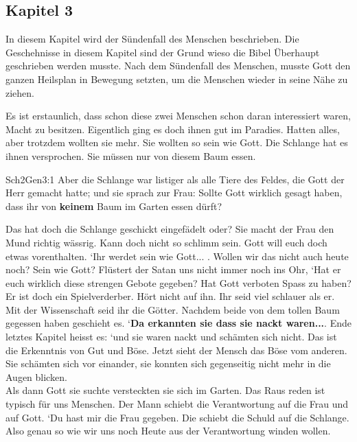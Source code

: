 \subsection{Kapitel 3}
In diesem Kapitel wird der Sündenfall des Menschen beschrieben. Die Geschehnisse in diesem Kapitel sind der Grund wieso die Bibel Überhaupt geschrieben werden musste. Nach dem Sündenfall des Menschen, musste Gott den ganzen Heilsplan in Bewegung setzten, um die Menschen wieder in seine Nähe zu ziehen.

Es ist erstaunlich, dass schon diese zwei Menschen schon daran interessiert waren, Macht zu besitzen. Eigentlich ging es doch ihnen gut im Paradies. Hatten alles, aber trotzdem wollten sie mehr. Sie wollten so sein wie Gott. Die Schlange hat es ihnen versprochen. Sie müssen nur von diesem Baum essen.
\begin{bibeltext}{Sch2}{Gen}{3:1}
	Aber die Schlange war listiger als alle Tiere des Feldes, die Gott der Herr gemacht hatte; und sie sprach zur Frau: Sollte Gott wirklich gesagt haben, dass ihr von \textbf{keinem} Baum im Garten essen dürft?
\end{bibeltext}
Das hat doch die Schlange geschickt eingefädelt oder? Sie macht der Frau den Mund richtig wässrig. Kann doch nicht so schlimm sein. Gott will euch doch etwas vorenthalten. \textquoteleft{Ihr werdet sein wie Gott... }. Wollen wir das nicht auch heute noch? Sein wie Gott? Flüstert der Satan uns nicht immer noch ins Ohr, \textquoteleft{Hat er euch wirklich diese strengen Gebote gegeben? Hat Gott verboten Spass zu haben? Er ist doch ein Spielverderber. Hört nicht auf ihn. Ihr seid viel schlauer als er. Mit der Wissenschaft seid ihr die Götter}.
Nachdem beide von dem tollen Baum gegessen haben geschieht es. \textquoteleft{\textbf{Da erkannten sie dass sie nackt waren...}}. Ende letztes Kapitel heisst es: \textquoteleft{und sie waren nackt und schämten sich nicht}. Das ist die Erkenntnis von Gut und Böse. Jetzt sieht der Mensch das Böse vom anderen. Sie schämten sich vor einander, sie konnten sich gegenseitig nicht mehr in die Augen blicken.\\
Als dann Gott sie suchte versteckten sie sich im Garten. Das Raus reden ist typisch für uns Menschen. Der Mann schiebt die Verantwortung auf die Frau und auf Gott. \textquoteleft{Du hast mir die Frau gegeben}. Die schiebt die Schuld auf die Schlange. Also genau so wie wir uns noch Heute aus der Verantwortung winden wollen.

